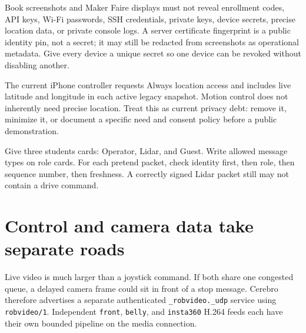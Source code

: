 \documentclass[11pt,openany]{book}
\begin{document}
\begin{safetybox}[title={NEVER PRINT REAL PAIRING MATERIAL}]
Book screenshots and Maker Faire displays must not reveal enrollment codes, API keys, Wi-Fi passwords, SSH credentials, private keys, device secrets, precise location data, or private console logs. A server certificate fingerprint is a public identity pin, not a secret; it may still be redacted from screenshots as operational metadata. Give every device a unique secret so one device can be revoked without disabling another.

The current iPhone controller requests Always location access and includes live latitude and longitude in each active legacy snapshot. Motion control does not inherently need precise location. Treat this as current privacy debt: remove it, minimize it, or document a specific need and consent policy before a public demonstration.
\end{safetybox}

\begin{buildbox}[title={LOCKED MAILBOX GAME}]
Give three students cards: Operator, Lidar, and Guest. Write allowed message types on role cards. For each pretend packet, check identity first, then role, then sequence number, then freshness. A correctly signed Lidar packet still may not contain a drive command.
\end{buildbox}


\chapter{Control and camera data take separate roads}

Live video is much larger than a joystick command. If both share one congested queue, a delayed camera frame could sit in front of a stop message. Cerebro therefore advertises a separate authenticated \texttt{\_robvideo.\_udp} service using \texttt{robvideo/1}. Independent \texttt{front}, \texttt{belly}, and \texttt{insta360} H.264 feeds each have their own bounded pipeline on the media connection.
\end{document}
